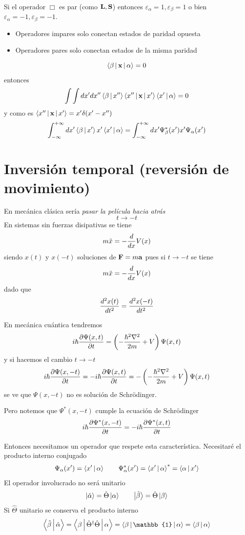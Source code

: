 \documentclass[10pt,oneside]{CBFT_book}
\begin{document}
Si el operador $\Box$ es par (como $\vb{L}, \vb{S}$) entonces $\varepsilon_\alpha=1,
\varepsilon_\beta=1$ o bien $\varepsilon_\alpha=-1,\varepsilon_\beta=-1$.

\begin{itemize}
 \item Operadores impares solo conectan estados de paridad opuesta
 \item Operadores pares solo conectan estados de la misma paridad 
\end{itemize}

\[
	\Braket{\beta|\vb{x}|\alpha} = 0 
\]
entonces
\[
	\int\int dx'dx''\Braket{\beta|x''}\Braket{x''|\vb{x}|x'}\Braket{x'|\alpha}= 0
\]
y como es $\Braket{x''|\vb{x}|x'} = x' \delta(x' -x'')$
\[
	\int_{-\infty}^{+\infty} dx'\Braket{\beta|x'} x' \Braket{x'|\alpha} =
	\int_{-\infty}^{+\infty} dx'\Psi_\beta^*(x') x' \Psi_\alpha (x')
\]

\section{Inversión temporal (reversión de movimiento)}


En mecánica clásica sería {\it pasar la película hacia atrás}
\[
	t \longrightarrow -t
\]
En sistemas sin fuerzas disipativas se tiene 
\[
	m \ddot{x} = - \dtot{}{x} V(x)
\]
siendo $x(t)$ y $x(-t)$ soluciones de $\vb{F} = m\vb{a}$ pues si $t\to-t$ se tiene
\[
	m \ddot{x} = - \dtot{}{x} V(x)
\]
dado que 
\[
	\dtot[2]{x(t)}{t} = \dtot[2]{x(-t)}{t}
\]

En mecánica cuántica tendremos 
\[
	i \hbar \dpar{\Psi(x,t)}{t} = \left( -\frac{\hbar^2\nabla^2}{2m} + V \right)\Psi(x,t)
\]
y si hacemos el cambio $t\to -t$
\[
	i \hbar \dpar{\Psi(x,-t)}{t} = -i \hbar \dpar{\Psi(x,t)}{t}  = 
	- \left( -\frac{\hbar^2\nabla^2}{2m} + V \right)\Psi(x,t)
\]
se ve que $\Psi(x,-t)$ no es solución de Schrödinger. 

Pero notemos que $\Psi^*(x,-t)$ cumple la ecuación de Schrödinger
\[
	i \hbar \dpar{\Psi^*(x,-t)}{t} = -i \hbar \dpar{\Psi^*(x,t)}{t} 
\]

Entonces necesitamos un operador que respete esta característica.
Necesitaré el producto interno conjugado 
\[
	\Psi_\alpha(x') = \Braket{x'|\alpha} \qquad
	\Psi^*_\alpha(x') = \Braket{x'|\alpha}^* = \Braket{\alpha|x'}
\]
El operador involucrado no será unitario 
\[
	\Ket{\tilde{\alpha}} = \hat{\Theta}\Ket{\alpha} \qquad 
	\Ket{\tilde{\beta}} = \hat{\Theta}\Ket{\beta}
\]
Si $\hat{\Theta}$ unitario se conserva el producto interno 
\[
	\Braket{\hat{\beta}|\hat{\alpha}} = 
	\Braket{\beta|\hat{\Theta}^\dagger\hat{\Theta}|\alpha} =
	\Braket{\beta|\mathbb{1}|\alpha} = \Braket{\beta|\alpha}
\]
\end{document}
